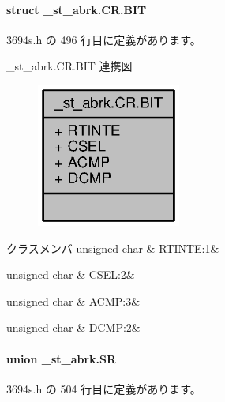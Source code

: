 \paragraph{struct \+\_\+st\+\_\+abrk.\+C\+R.\+B\+I\+T}


 3694s.\+h の 496 行目に定義があります。



\+\_\+st\+\_\+abrk.\+C\+R.\+B\+I\+T 連携図
\nopagebreak
\begin{figure}[H]
\begin{center}
\leavevmode
\includegraphics[width=134pt]{d4/d2d/struct__st__abrk_8CR_8BIT__coll__graph}
\end{center}
\end{figure}
\begin{DoxyFields}{クラスメンバ}
unsigned char\label{3694s_8h_aa1efba9290a70ec45c4933b08d6f395b}
&
R\+T\+I\+N\+T\+E\+:1&
\\
\hline

unsigned char\label{3694s_8h_a91011e2dc98ae525a9435b3fa1ab2670}
&
C\+S\+E\+L\+:2&
\\
\hline

unsigned char\label{3694s_8h_a6c5ea9f82ae58f3f6a31dcb63e4d6779}
&
A\+C\+M\+P\+:3&
\\
\hline

unsigned char\label{3694s_8h_abfb39261c1f488b0deadbc9d945eeea3}
&
D\+C\+M\+P\+:2&
\\
\hline

\end{DoxyFields}
\label{union__st__abrk_8SR}
\paragraph{union \+\_\+st\+\_\+abrk.\+S\+R}


 3694s.\+h の 504 行目に定義があります。



